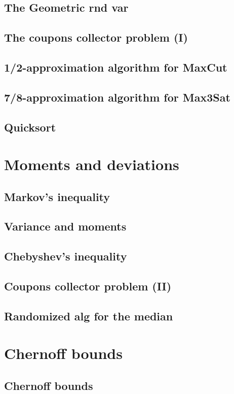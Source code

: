 \documentclass{book}
\begin{document}
\section{The Geometric rnd var}
\section{The coupons collector problem (I)}
\section{1/2-approximation algorithm for MaxCut}
\section{7/8-approximation algorithm for Max3Sat}
\section{Quicksort}

\chapter{Moments and deviations}
\section{Markov's inequality}
\section{Variance and moments}
\section{Chebyshev's inequality}
\section{Coupons collector problem (II)}
\section{Randomized alg for the median}

\chapter{Chernoff bounds}
\section{Chernoff bounds}
\end{document}

